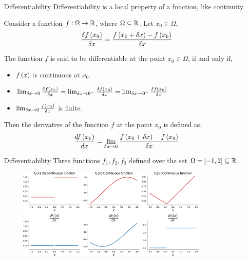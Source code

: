\documentclass[aspectratio=169]{beamer}
\let\olditem\item
\renewcommand{\item}{\setlength{\itemsep}{\fill}\olditem}
\def\mb{\ensuremath\mathbb}
\def\lp{\ensuremath\left(}
\def\rp{\ensuremath\right)}
\def\R{\ensuremath\mb{R}}
\newcommand{\ct}[1]{\lp #1\rp}
\begin{document}
\begin{frame}[t]{Differentiability}
  Differentiability is a local property of a function, like continuity. 
  
  Consider a function $f: \Omega \to \R$, where $\Omega \subseteq \R$. Let $x_0 \in \Omega$,
  \[ \frac{\delta f\ct{x_0}}{\delta x} = \frac{f\ct{x_0 + \delta x} - f\ct{x_0}}{\delta x} \]

  The function $f$ is said to be differentiable at the point $x_0 \in \Omega$, if and only if,
  \begin{itemize}
    \item $f\ct{x}$ is continuous at $x_0$.
    \item $\lim_{\delta x \to 0} \frac{\delta f\ct{x_0}}{\delta x} = \lim_{\delta x \to 0^-}\frac{\delta f\ct{x_0}}{\delta x}  = \lim_{\delta x \to 0^+} \frac{\delta f\ct{x_0}}{\delta x}$
    \item $\lim_{\delta x \to 0} \frac{f\ct{x_0}}{\delta x}$ is finite.
  \end{itemize}

  Then the derivative of the function  $f$ at the point $x_0$ is defined as,
  \[ \frac{df\ct{x_0}}{dx} = \lim_{\delta x \to 0} \frac{f\ct{x_0 + \delta x} - f\ct{x_0}}{\delta x} \]
\end{frame}


\begin{frame}[t]{Differentiability}
  Three functions $f_1, f_2, f_3$ defined over the set $\Omega = \left[ -1, 2\right] \subseteq \R$.
  
  \begin{figure}
    \centering
    \includegraphics[width=0.85\textwidth]{figs/func_diff.pdf}
  \end{figure}
\end{frame}
\end{document}
